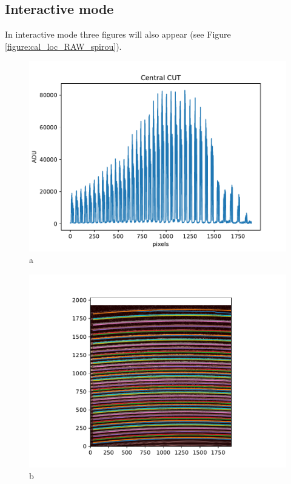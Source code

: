 \subsection{Interactive mode}

\noindent In interactive mode three figures will also appear (see Figure \ref{figure:cal_loc_RAW_spirou}).

\begin{figure}

\begin{center}
\begin{minipage}{.495\textwidth}
\begin{center}
\includegraphics[width=\textwidth]{Figures/cal_loc_RAW_spirou_1.pdf}
a
\end{center}
\end{minipage}%
\begin{minipage}{.495\textwidth}
\begin{center}
\includegraphics[width=\textwidth]{Figures/cal_loc_RAW_spirou_2.pdf}
b
\end{center}
\end{minipage}%
\end{center}


\end{figure}
